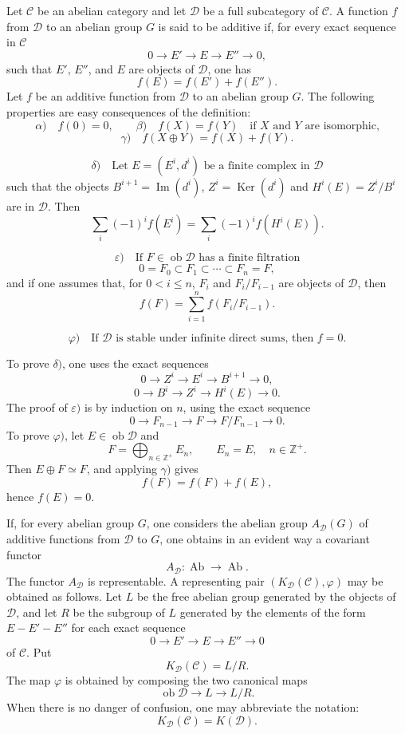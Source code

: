 \documentclass[11pt]{article}
\providecommand{\Ob}{\operatorname{ob}}
\providecommand{\cC}{\mathcal C}
\providecommand{\Ob}{\operatorname{ob}}
\providecommand{\Ab}{\operatorname{Ab}}
\providecommand{\cC}{\mathcal C}
\providecommand{\cD}{\mathcal D}
\providecommand{\Ab}{\operatorname{Ab}}
\providecommand{\Ob}{\operatorname{Ob}}
\providecommand{\Ob}{\operatorname{ob}}
\providecommand{\Ob}{\operatorname{Ob}}
\begin{document}
Let $\cC$ be an abelian category and let $\cD$ be a full subcategory of $\cC$. A function $f$ from $\cD$ to an abelian group $G$ is said to be additive if, for every exact sequence in $\cC$
\[
0\longrightarrow E'\longrightarrow E\longrightarrow E''\longrightarrow 0,
\]
such that $E'$, $E''$, and $E$ are objects of $\cD$, one has
\[
f(E)=f(E')+f(E'').
\]
Let $f$ be an additive function from $\cD$ to an abelian group $G$. The following properties are easy consequences of the definition:
\[
\alpha)\quad f(0)=0,\qquad
\beta)\quad f(X)=f(Y)\quad\text{if }X\text{ and }Y\text{ are isomorphic,}
\]
\[
\gamma)\quad f(X\oplus Y)=f(X)+f(Y).
\]

\[
\delta)\quad
\text{Let }E=(E^i,d^i)\text{ be a finite complex in }\cD
\]
such that the objects $B^{i+1}=\operatorname{Im}(d^i)$, $Z^i=\operatorname{Ker}(d^i)$ and $H^i(E)=Z^i/B^i$ are in $\cD$. Then
\[
\sum_i (-1)^i f(E^i)=\sum_i (-1)^i f(H^i(E)).
\]

\[
\varepsilon)\quad
\text{If }F\in\Ob \cD\text{ has a finite filtration}
\]
\[
0=F_0\subset F_1\subset\cdots\subset F_n=F,
\]
and if one assumes that, for $0<i\le n$, $F_i$ and $F_i/F_{i-1}$ are objects of $\cD$, then
\[
f(F)=\sum_{i=1}^n f(F_i/F_{i-1}).
\]

\[
\varphi)\quad
\text{If }\cD\text{ is stable under infinite direct sums, then }f=0.
\]

To prove $\delta)$, one uses the exact sequences
\[
0\longrightarrow Z^i\longrightarrow E^i\longrightarrow B^{i+1}\longrightarrow 0,
\]
\[
0\longrightarrow B^i\longrightarrow Z^i\longrightarrow H^i(E)\longrightarrow 0.
\]
The proof of $\varepsilon)$ is by induction on $n$, using the exact sequence
\[
0\longrightarrow F_{n-1}\longrightarrow F\longrightarrow F/F_{n-1}\longrightarrow 0.
\]
To prove $\varphi)$, let $E\in\Ob\cD$ and
\[
F=\bigoplus_{n\in\mathbb Z^+}E_n,\qquad E_n=E,\quad n\in\mathbb Z^+.
\]
Then $E\oplus F\simeq F$, and applying $\gamma)$ gives
\[
f(F)=f(F)+f(E),
\]
hence $f(E)=0$.

If, for every abelian group $G$, one considers the abelian group $A_{\cD}(G)$ of additive functions from $\cD$ to $G$, one obtains in an evident way a covariant functor
\[
A_{\cD}:\Ab\longrightarrow\Ab.
\]
The functor $A_{\cD}$ is representable. A representing pair $(K_{\cD}(\cC),\varphi)$ may be obtained as follows. Let $L$ be the free abelian group generated by the objects of $\cD$, and let $R$ be the subgroup of $L$ generated by the elements of the form $E-E'-E''$ for each exact sequence
\[
0\longrightarrow E'\longrightarrow E\longrightarrow E''\longrightarrow 0
\]
of $\cC$. Put
\[
K_{\cD}(\cC)=L/R.
\]
The map $\varphi$ is obtained by composing the two canonical maps
\[
\Ob\cD\longrightarrow L\longrightarrow L/R.
\]
When there is no danger of confusion, one may abbreviate the notation:
\[
K_{\cD}(\cC)=K(\cD).
\]
\end{document}
